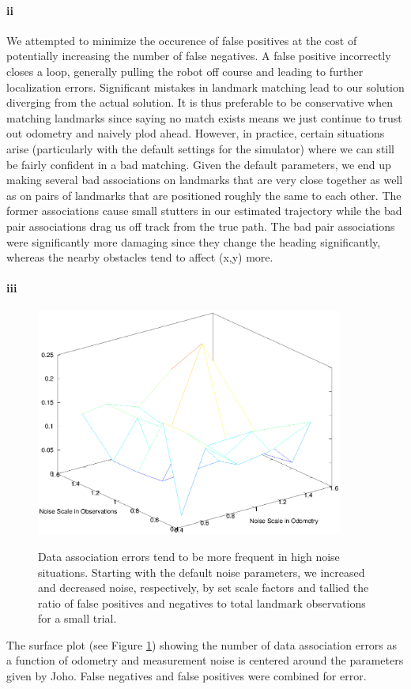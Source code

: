 \documentclass[12pt]{article}
\begin{document}
\paragraph{ii}
We attempted to minimize the occurence of false positives at the cost of potentially increasing the number of false negatives.
A false positive incorrectly closes a loop, generally pulling the robot off course and leading to further localization errors.
Significant mistakes in landmark matching lead to our solution diverging from the actual solution. It is thus preferable to be
conservative when matching landmarks since saying no match exists means we just continue to trust out odometry and naively
plod ahead. However, in practice, certain situations arise (particularly with the default settings for the simulator) where
we can still be fairly confident in a bad matching. Given the default parameters, we end up making several bad associations on
landmarks that are very close together as well as on pairs of landmarks that are positioned roughly the same to each other.
The former associations cause small stutters in our estimated trajectory while the bad pair associations drag us off track
from the true path. The bad pair associations were significantly more damaging since they change the heading significantly,
whereas the nearby obstacles tend to affect (x,y) more.

\paragraph{iii}
\begin{figure}[h!]
\centering
\includegraphics[width=0.9\textwidth]{figures/error_plot.eps}
\label{fig:assoc_err}
\caption{Data association errors tend to be more frequent in high noise situations. Starting with
the default noise parameters, we increased and decreased noise, respectively, by set scale factors
and tallied the ratio of false positives and negatives to total landmark observations for a small
trial. }
\end{figure}

The surface plot (see Figure \ref{fig:assoc_err}) showing the number of data association errors as a function of odometry and measurement noise is centered around the parameters given by Joho.  False negatives and false positives were combined for error.
\end{document}
